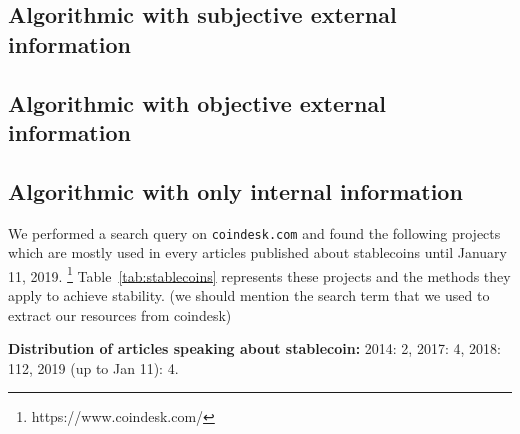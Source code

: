 \subsection{Algorithmic with subjective external information}

\subsection{Algorithmic with objective external information}

\subsection{Algorithmic with only internal information}

We performed a search query on \texttt{coindesk.com} and found the following projects which are mostly used in every articles published about stablecoins until January 11, 2019. \footnote{https://www.coindesk.com/} Table~\ref{tab:stablecoins} represents these projects and the methods they apply to achieve stability. (we should mention the search term that we used to extract our resources from coindesk)


\textbf{Distribution of articles speaking about stablecoin:} 2014: 2, 2017: 4, 2018: 112, 2019 (up to Jan 11): 4.


